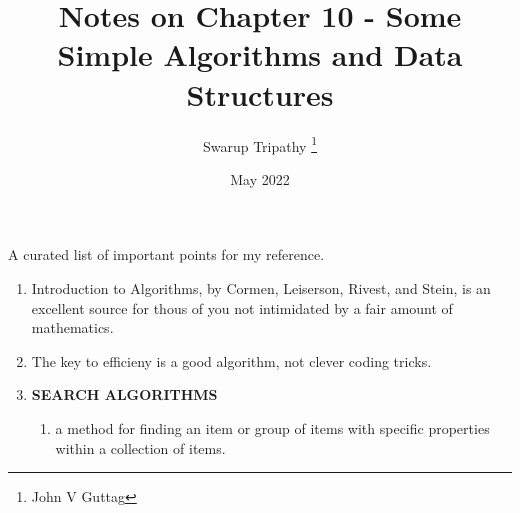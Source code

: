 \documentclass[11pt]{article}
\title{Notes on Chapter 10 - Some Simple Algorithms and Data Structures}
\author{Swarup Tripathy \thanks{John V Guttag}}
\date{May 2022}
\begin{document}
    \maketitle
    A curated list of important points for my reference.\\
    \begin{enumerate}
        \item Introduction to Algorithms, by Cormen, Leiserson, Rivest, and Stein, is an excellent source for thous of you not intimidated by a fair amount of mathematics.
        \item The key to efficieny is a good algorithm, not clever coding tricks.
        \item \textbf{SEARCH ALGORITHMS}
        \begin{enumerate}
            \item a method for finding an item or group of items with specific properties within a collection of items.
        \end{enumerate}
    \end{enumerate}
\end{document}
